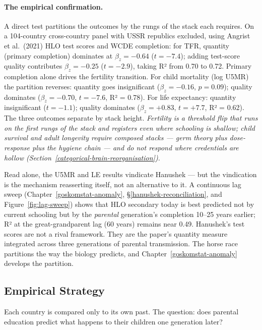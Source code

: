 \documentclass[12pt,letterpaper]{article}
\begin{document}
\paragraph{The empirical confirmation.}

A direct test partitions the outcomes by the rungs of the stack
each requires. On a 104-country cross-country panel with USSR republics
excluded, using Angrist et al.\ (2021) HLO test scores and WCDE
completion: for TFR, quantity (primary completion) dominates at
$\beta_z = -0.64$ ($t = -7.4$); adding test-score quality
contributes $\beta_z = -0.25$ ($t = -2.9$), taking R² from 0.70 to
0.72. Primary completion alone drives the fertility transition.
For child mortality (log U5MR) the partition reverses: quantity
goes insignificant ($\beta_z = -0.16$, $p = 0.09$); quality
dominates ($\beta_z = -0.70$, $t = -7.6$, R² = 0.78). For life
expectancy: quantity insignificant ($t = -1.1$); quality dominates
($\beta_z = +0.83$, $t = +7.7$, R² = 0.62). The three outcomes
separate by stack height. \emph{Fertility is a threshold flip that
runs on the first rungs of the stack and registers even where
schooling is shallow; child survival and adult longevity require
composed stacks --- germ theory plus dose-response plus the hygiene
chain --- and do not respond where credentials are hollow
(Section~\ref{categorical-brain-reorganisation}).}

Read alone, the U5MR and LE results vindicate Hanushek --- but the
vindication is the mechanism reasserting itself, not an alternative
to it. A continuous lag sweep (Chapter~\ref{goskomstat-anomaly},
\S\ref{hanushek-reconciliation}, and Figure~\ref{fig:lag-sweep})
shows that HLO secondary today is best predicted not by current
schooling but by the \emph{parental} generation's completion 10--25
years earlier; R² at the great-grandparent lag (60 years) remains
near 0.49. Hanushek's test scores are not a rival framework. They
are the paper's quantity measure integrated across three generations
of parental transmission. The horse race partitions the way the
biology predicts, and Chapter~\ref{goskomstat-anomaly} develops the
partition.

\subsection{Empirical Strategy}\label{empirical-strategy}

Each country is compared only to its own past. The question: does parental education predict what happens to their children one generation later?
\end{document}
